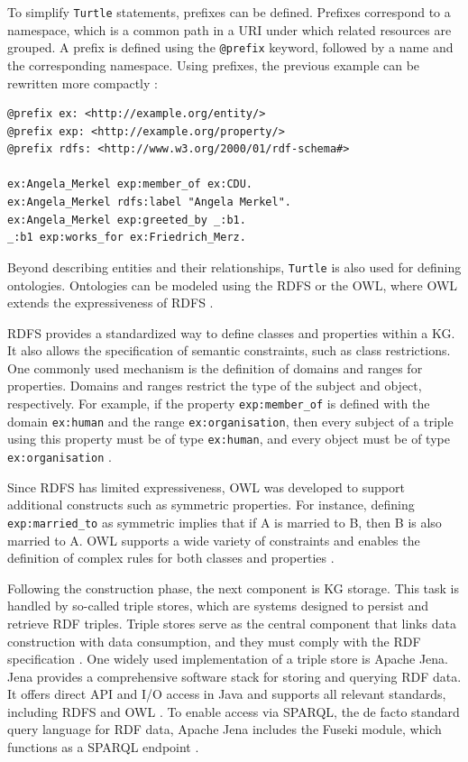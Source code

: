 \documentclass[a4paper,oneside,bibliography=totoc]{scrbook}
\begin{document}
\pagebreak

To simplify \texttt{Turtle} statements, prefixes can be defined. Prefixes correspond to a namespace, which is a common path in a \ac{URI} under which related resources are grouped. A prefix is defined using the \texttt{@prefix} keyword, followed by a name and the corresponding namespace. Using prefixes, the previous example can be rewritten more compactly \cite{Tomaszuk2020}:

\begin{lstlisting}[language=Turtle, caption=Example of a Knowledge Graph in \texttt{Turtle} Format with Prefixes, label=lst:turtle_example]
@prefix ex: <http://example.org/entity/>
@prefix exp: <http://example.org/property/>
@prefix rdfs: <http://www.w3.org/2000/01/rdf-schema#>

ex:Angela_Merkel exp:member_of ex:CDU.
ex:Angela_Merkel rdfs:label "Angela Merkel".
ex:Angela_Merkel exp:greeted_by _:b1.
_:b1 exp:works_for ex:Friedrich_Merz.
\end{lstlisting}

Beyond describing entities and their relationships, \texttt{Turtle} is also used for defining ontologies. Ontologies can be modeled using the \ac{RDFS} or the \ac{OWL}, where OWL extends the expressiveness of RDFS \cite{Gayo2018}.

\ac{RDFS} provides a standardized way to define classes and properties within a \ac{KG}. It also allows the specification of semantic constraints, such as class restrictions. One commonly used mechanism is the definition of domains and ranges for properties. Domains and ranges restrict the type of the subject and object, respectively. For example, if the property \texttt{exp:member\_of} is defined with the domain \texttt{ex:human} and the range \texttt{ex:organisation}, then every subject of a triple using this property must be of type \texttt{ex:human}, and every object must be of type \texttt{ex:organisation} \cite{VillazonTerrazas2017}.

Since \ac{RDFS} has limited expressiveness, \ac{OWL} was developed to support additional constructs such as symmetric properties. For instance, defining \texttt{exp:married\_to} as symmetric implies that if A is married to B, then B is also married to A. \ac{OWL} supports a wide variety of constraints and enables the definition of complex rules for both classes and properties \cite{VillazonTerrazas2017}.

Following the construction phase, the next component is \ac{KG} storage. This task is handled by so-called triple stores, which are systems designed to persist and retrieve RDF triples. Triple stores serve as the central component that links data construction with data consumption, and they must comply with the \ac{RDF} specification \cite{Rusher2003}. One widely used implementation of a triple store is Apache Jena. Jena provides a comprehensive software stack for storing and querying RDF data. It offers direct API and I/O access in Java and supports all relevant standards, including \ac{RDFS} and \ac{OWL} \cite{Carroll2004}. To enable access via \ac{SPARQL}, the de facto standard query language for RDF data, Apache Jena includes the Fuseki module, which functions as a \ac{SPARQL} endpoint \cite{Chokshi2022}.
\end{document}
